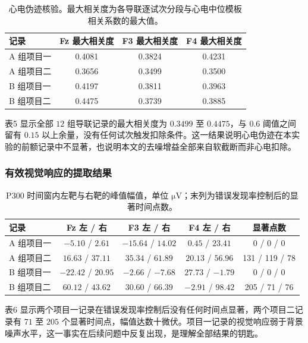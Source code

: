 \documentclass[bwprint]{gmcmthesis}
\begin{document}
\begin{table}[htp!]
\centering
\renewcommand\arraystretch{1.2}
\caption{心电伪迹核验。最大相关度为各导联逐试次分段与心电中位模板相关系数的最大值。}
\begin{tabular}{|l|c|c|c|}
  \hline
  记录 & Fz 最大相关度 & F3 最大相关度 & F4 最大相关度 \\
  \hline
  A 组项目一 & 0.4081 & 0.3824 & 0.4231 \\
  \hline
  A 组项目二 & 0.3656 & 0.3499 & 0.3500 \\
  \hline
  B 组项目一 & 0.4197 & 0.3811 & 0.3963 \\
  \hline
  B 组项目二 & 0.4475 & 0.3739 & 0.3885 \\
  \hline
\end{tabular}
\end{table}

表5 显示全部 $12$ 组导联记录的最大相关度为 $0.3499$ 至 $0.4475$，与 $0.6$ 阈值之间留有 $0.15$ 以上余量，没有任何试次触发扣除条件。这一结果说明心电伪迹在本实验的前额记录中不显著，也说明本文的去噪增益全部来自软截断而非心电扣除。

\subsubsection{有效视觉响应的提取结果}

\begin{table}[htp!]
\centering
\renewcommand\arraystretch{1.2}
\caption{P300 时间窗内左靶与右靶的峰值幅值，单位 $\si{\micro\volt}$；末列为错误发现率控制后的显著时间点数。}
\begin{tabular}{|l|c|c|c|c|}
  \hline
  记录 & Fz 左 / 右 & F3 左 / 右 & F4 左 / 右 & 显著点数 \\
  \hline
  A 组项目一 & $-5.10$ / $2.61$ & $-15.64$ / $14.02$ & $0.45$ / $23.41$ & 0 / 0 / 0 \\
  \hline
  A 组项目二 & $16.63$ / $37.11$ & $35.34$ / $61.89$ & $20.13$ / $56.96$ & 131 / 119 / 78 \\
  \hline
  B 组项目一 & $-22.42$ / $20.95$ & $-2.66$ / $-7.68$ & $27.73$ / $-1.79$ & 0 / 0 / 0 \\
  \hline
  B 组项目二 & $60.12$ / $43.62$ & $30.60$ / $66.39$ & $-2.91$ / $98.42$ & 205 / 71 / 76 \\
  \hline
\end{tabular}
\end{table}

表6 显示两个项目一记录在错误发现率控制后没有任何时间点显著，两个项目二记录有 $71$ 至 $205$ 个显著时间点，幅值达数十微伏。项目一记录的视觉响应弱于背景噪声水平，这一事实在后续问题中反复出现，是理解全部结果的钥匙。
\end{document}
